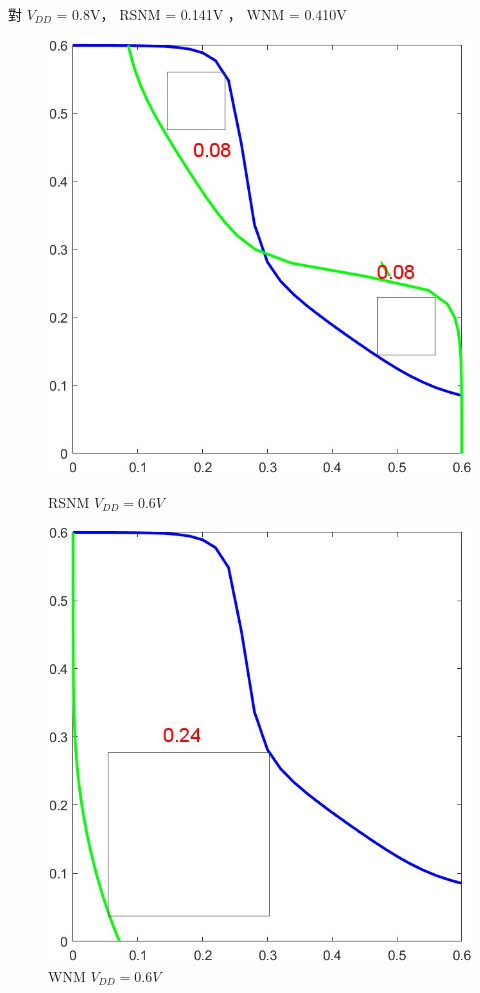 \documentclass{article}
\begin{document}
\vspace*{-1cm}
對 $V_{DD}$ = 0.8V， RSNM = 0.141V ， WNM = 0.410V

\begin{figure}[H]
\centering
\begin{minipage}[t]{0.28\textwidth}
\centering
    \includegraphics[width=\textwidth]{./img/2023-11-12-01-09-51.png}
\caption{RSNM $V_{DD} = 0.6V$}
\label{rsnm06}
\end{minipage}
\qquad
\begin{minipage}[t]{0.28\textwidth}
\centering
    \includegraphics[width=\textwidth]{./img/2023-11-12-01-11-20.png}
\caption{WNM $V_{DD} = 0.6V$}
\label{wnm06}
\end{minipage}
\end{figure}
\end{document}
